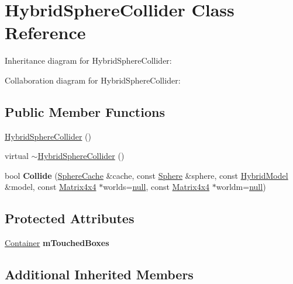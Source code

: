 \hypertarget{class_hybrid_sphere_collider}{\section{Hybrid\+Sphere\+Collider Class Reference}
\label{class_hybrid_sphere_collider}
}


Inheritance diagram for Hybrid\+Sphere\+Collider\+:


Collaboration diagram for Hybrid\+Sphere\+Collider\+:
\subsection*{Public Member Functions}
\begin{DoxyCompactItemize}
\item 
\hyperlink{class_hybrid_sphere_collider_a503c9df2597a80a88b7882e26916ebbd}{Hybrid\+Sphere\+Collider} ()
\item 
virtual \hyperlink{class_hybrid_sphere_collider_a1df97d0aecf6953da20ba22ba85a236b}{$\sim$\+Hybrid\+Sphere\+Collider} ()
\item 
\hypertarget{class_hybrid_sphere_collider_ae7b7c5befe93b1cef898b2f75746edbe}{bool {\bfseries Collide} (\hyperlink{struct_sphere_cache}{Sphere\+Cache} \&cache, const \hyperlink{class_sphere}{Sphere} \&sphere, const \hyperlink{class_hybrid_model}{Hybrid\+Model} \&model, const \hyperlink{class_matrix4x4}{Matrix4x4} $\ast$worlds=\hyperlink{_ice_types_8h_ac97b8ee753e4405397a42ad5799b0f9e}{null}, const \hyperlink{class_matrix4x4}{Matrix4x4} $\ast$worldm=\hyperlink{_ice_types_8h_ac97b8ee753e4405397a42ad5799b0f9e}{null})}\label{class_hybrid_sphere_collider_ae7b7c5befe93b1cef898b2f75746edbe}

\end{DoxyCompactItemize}
\subsection*{Protected Attributes}
\begin{DoxyCompactItemize}
\item 
\hypertarget{class_hybrid_sphere_collider_a72c848a0c71cfcc0cf4d2757f252bac4}{\hyperlink{class_container}{Container} {\bfseries m\+Touched\+Boxes}}\label{class_hybrid_sphere_collider_a72c848a0c71cfcc0cf4d2757f252bac4}

\end{DoxyCompactItemize}
\subsection*{Additional Inherited Members}


